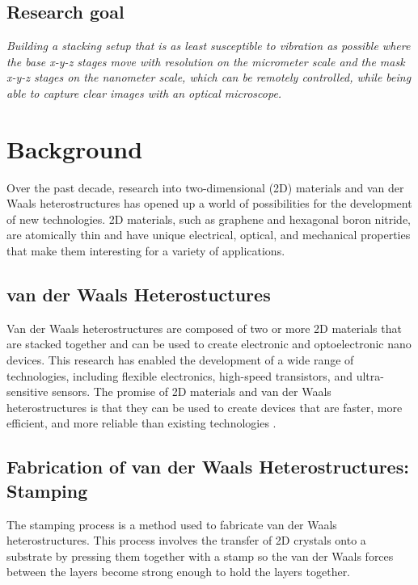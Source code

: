 \documentclass[11pt]{article}
\begin{document}
\subsection{Research goal}
\begin{center}
    \textit{Building a stacking setup that is as least susceptible to vibration as possible where the base x-y-z stages move with resolution on the micrometer scale and the mask x-y-z stages on the nanometer scale, which can be remotely controlled, while being able to capture clear images with an optical microscope.}
\end{center}

\clearpage

\section{Background}
Over the past decade, research into two-dimensional (2D) materials and van der Waals heterostructures has opened up a world of possibilities for the development of new technologies. 2D materials, such as graphene and hexagonal boron nitride, are atomically thin and have unique electrical, optical, and mechanical properties that make them interesting for a variety of applications.

\subsection{van der Waals Heterostuctures}

Van der Waals heterostructures are composed of two or more 2D materials that are stacked together and can be used to create electronic and optoelectronic nano devices. 
This research has enabled the development of a wide range of technologies, including flexible electronics, high-speed transistors, and ultra-sensitive sensors. 
The promise of 2D materials and van der Waals heterostructures is that they can be used to create devices that are faster, more efficient, and more reliable than existing technologies \citep{geimVanWaalsHeterostructures2013}.

 \subsection{Fabrication of van der Waals Heterostructures: Stamping}
 The stamping process is a method used to fabricate van der Waals heterostructures.
 This process involves the transfer of 2D crystals onto a substrate by pressing them together with a stamp so the van der Waals forces between the layers become strong enough to hold the layers together.
\end{document}
